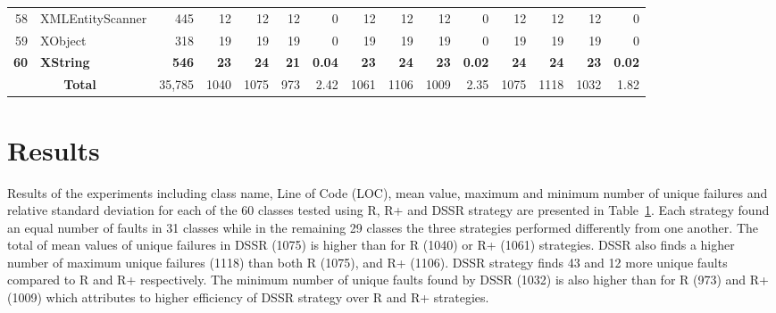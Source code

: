 \documentclass[conference]{IEEEtran}
\begin{document}
\begin{table} [htp!]
{\begin{tabularx}{1 \textwidth}{r l r r r r r r r r r r r r r}
58						& XMLEntityScanner			&445		& 12		&	12	&	12	& 	0					& 12		&  12		& 12		& 		0			& 12			& 12			& 12			&	0\\      
59						& XObject					&318		& 19		&	19	&	19	& 	0					& 19		&  19		& 19		& 		0			& 19			& 19			& 19			&	0\\      
\textbf{60}						& \textbf{XString}					&\textbf{546}		& \textbf{23}		&	\textbf{24}	&	\textbf{21}	& 	\textbf{0.04}					& \textbf{23}		&  \textbf{24}		& \textbf{23}		& 		\textbf{0.02}			& \textbf{24}			& \textbf{24}			& \textbf{23}			&	\textbf{0.02}\\      

    						\multicolumn{2}{c}{\textbf{Total}}	&35,785	&1040	&	1075	&    973	&	2.42				& 1061	&1106	&1009	&		2.35		& 1075		& 1118		& 1032		& 	1.82\\
     \end{tabularx} }
    \bigskip
    \label{table:Results}
\end{table}

\section{Results}\label{sec:res}
Results of the experiments including class name, Line of Code (LOC), mean value, maximum and minimum number of unique failures and relative standard deviation for each of the 60 classes tested using R, R+ and DSSR strategy are presented in Table~\ref{table:Results}. Each strategy found an equal number of faults in 31 classes while in the remaining 29 classes the three strategies performed differently from one another. The total of mean values of unique failures in DSSR (1075) is higher than for R (1040) or R+ (1061) strategies. 
DSSR also finds a higher number of maximum unique failures (1118) than both R (1075), and R+ (1106). DSSR strategy finds 43 and 12 more unique faults compared to R and R+ respectively. The minimum number of unique faults found by DSSR (1032) is also higher than for R (973) and R+ (1009) which attributes to higher efficiency of DSSR strategy over R and R+ strategies. 

\end{document}
